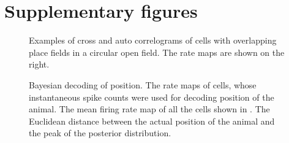 
\chapter{Supplementary figures} %

\label{supl} %



\begin{figure}
\centering
{}
\end{figure}

\begin{figure}
\ContinuedFloat %
\centering
{}
\caption[]{Examples of cross and auto correlograms of cells with overlapping place fields in a circular open field. The rate maps are shown on the right.}
\label{fig:ccgs}
\end{figure}

\begin{figure}
\centering
{}
\caption[]{Bayesian decoding of position.  The rate maps of cells, whose instantaneous spike counts were used for decoding position of the animal.  The mean firing rate map of all the cells shown in .  The Euclidean distance between the actual position of the animal and the peak of the posterior distribution.}
\label{fig:decodePos}
\end{figure}